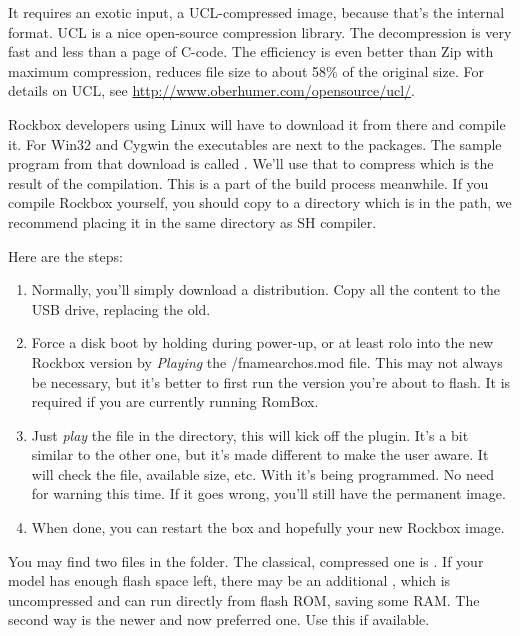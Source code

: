 It requires an exotic input, a UCL-compressed image, because that's the internal 
format. UCL is a nice open-source compression library. The decompression is very 
fast and less than a page of C-code. The efficiency is even better than Zip with 
maximum compression, reduces file size to about 58\% of the original size. For 
details on UCL, see \url{http://www.oberhumer.com/opensource/ucl/}.

Rockbox developers using Linux will have to download it from there and compile 
it. For Win32 and Cygwin the executables are next to the packages. The sample 
program from that download is called . We'll use that to compress 
 which is the result of the compilation. This is a part of the
build process meanwhile. If you compile Rockbox yourself, you should copy 
 to a directory which is in the path, we recommend placing it in 
the same directory as SH compiler.


Here are the steps:

\begin{enumerate}
\item Normally, you'll simply download a  distribution. Copy all the 
  content to the USB drive, replacing the old.
\item Force a disk boot by holding  during power-up, or at least rolo into
  the new Rockbox version by \emph{Playing} the /fname{archos.mod} file. This may not always be necessary, but it's better to first run the 
  version you're about to flash. It is required if you are currently running 
  RomBox.
\item Just \emph{play} the  file in the  directory, 
  this will kick off the  plugin. It's a bit similar 
  to the other one, but it's made different to make the user aware. It will check
  the file, available size, etc. With  it's being programmed. No need for 
  warning this time. If it goes wrong, you'll still have the permanent image.
\item When done, you can restart the box and hopefully your new Rockbox image.
\end{enumerate}

You may find two  files in the  folder. The 
classical, compressed one is . If your model has enough flash 
space left, there may be an additional , which is uncompressed 
and can run directly from flash ROM, saving some RAM. The second way is the newer
and now preferred one. Use this if available.

